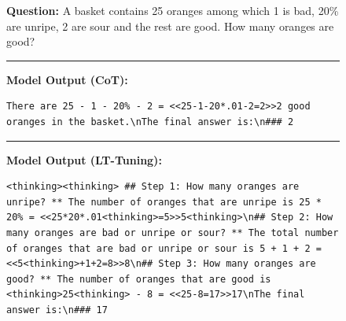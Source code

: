\documentclass{article}
\theoremstyle{plain}
\theoremstyle{definition}
\theoremstyle{remark}
\begin{document}
\begin{figure}[h]
\centering
\begin{tcolorbox}[colback=blue!5, colframe=blue!50, title=Example 4]
\textbf{Question:} A basket contains 25 oranges among which 1 is bad, 20\% are unripe, 2 are sour and the rest are good. How many oranges are good?

\rule{\linewidth}{0.7pt}

\textbf{Model Output (CoT):}

\begin{lstlisting}
There are 25 - 1 - 20% - 2 = <<25-1-20*.01-2=2>>2 good oranges in the basket.\nThe final answer is:\n### 2
\end{lstlisting}
\rule{\linewidth}{0.7pt}
\textbf{Model Output (LT-Tuning):}
\begin{lstlisting}
<thinking><thinking> ## Step 1: How many oranges are unripe? ** The number of oranges that are unripe is 25 * 20% = <<25*20*.01<thinking>=5>>5<thinking>\n## Step 2: How many oranges are bad or unripe or sour? ** The total number of oranges that are bad or unripe or sour is 5 + 1 + 2 = <<5<thinking>+1+2=8>>8\n## Step 3: How many oranges are good? ** The number of oranges that are good is <thinking>25<thinking> - 8 = <<25-8=17>>17\nThe final answer is:\n### 17
\end{lstlisting}
\end{tcolorbox}
\label{fig:example4}
\end{figure}

\end{document}
